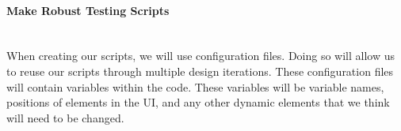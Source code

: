 \paragraph{Make Robust Testing Scripts} \mbox{}\\[\paragraphheaderspace]
When creating our scripts, we will use configuration files. Doing so will allow us to reuse our scripts through multiple design iterations. These configuration files will contain variables within the code. These variables will be variable names, positions of elements in the UI, and any other dynamic elements that we think will need to be changed.

